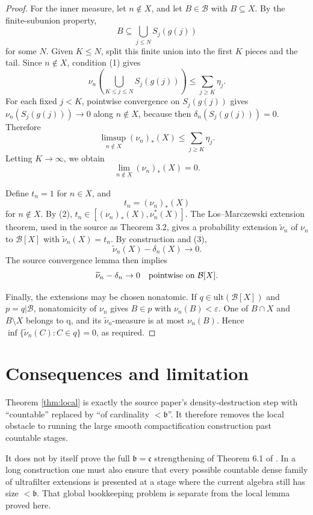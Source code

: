 \documentclass[11pt]{amsart}
\theoremstyle{definition}
\newcommand{\ult}{\mathrm{ult}}
\begin{document}
\begin{proof}
For the inner measure, let \(n\notin X\), and let \(B\in\mathcal B\) with
\(B\subseteq X\).  By the finite-subunion property,
\[
        B\subseteq \bigcup_{j\le N}S_j(g(j))
\]
for some \(N\).  Given \(K\le N\), split this finite union into the first
\(K\) pieces and the tail.  Since \(n\notin X\), condition (1) gives
\[
        \nu_n\!\left(\bigcup_{K\le j\le N}S_j(g(j))\right)
        \le \sum_{j\ge K}\eta_j.
\]
For each fixed \(j<K\), pointwise convergence on \(S_j(g(j))\) gives
\(\nu_n(S_j(g(j)))\to0\) along \(n\notin X\), because then
\(\delta_n(S_j(g(j)))=0\).  Therefore
\[
        \limsup_{n\notin X}(\nu_n)_*(X)
        \le \sum_{j\ge K}\eta_j.
\]
Letting \(K\to\infty\), we obtain
\[
        \lim_{n\notin X}(\nu_n)_*(X)=0.     \tag{3}
\]

Define \(t_n=1\) for \(n\in X\), and
\[
        t_n=(\nu_n)_*(X)
\]
for \(n\notin X\).  By (2), \(t_n\in[(\nu_n)_*(X),\nu_n^*(X)]\).  The
Los--Marczewski extension theorem, used in the source as Theorem 3.2, gives a
probability extension \(\widetilde\nu_n\) of \(\nu_n\) to
\(\mathcal B[X]\) with \(\widetilde\nu_n(X)=t_n\).  By construction and (3),
\[
        \widetilde\nu_n(X)-\delta_n(X)\longrightarrow0.
\]
The source convergence lemma \cite[Lemma 3.3]{DP2016} then implies
\[
        \widetilde\nu_n-\delta_n\to0
        \quad\hbox{pointwise on }\mathcal B[X].
\]

Finally, the extensions may be chosen nonatomic.  If \(q\in\ult(\mathcal B[X])\)
and \(p=q|\mathcal B\), nonatomicity of \(\nu_n\) gives \(B\in p\) with
\(\nu_n(B)<\varepsilon\).  One of \(B\cap X\) and \(B\setminus X\) belongs to
q, and its \(\widetilde\nu_n\)-measure is at most \(\nu_n(B)\).  Hence
\(\inf\{\widetilde\nu_n(C):C\in q\}=0\), as required.
\end{proof}

\section*{Consequences and limitation}

Theorem \ref{thm:local} is exactly the source paper's density-destruction
step with ``countable'' replaced by ``of cardinality \(<\mathfrak b\)''.  It
therefore removes the local obstacle to running the large smooth compactification
construction past countable stages.

It does not by itself prove the full \(\mathfrak b=\mathfrak c\) strengthening
of Theorem 6.1 of \cite{DP2016}.  In a long construction one must also ensure
that every possible countable dense family of ultrafilter extensions is
presented at a stage where the current algebra still has size \(<\mathfrak b\).
That global bookkeeping problem is separate from the local lemma proved here.
\end{document}
